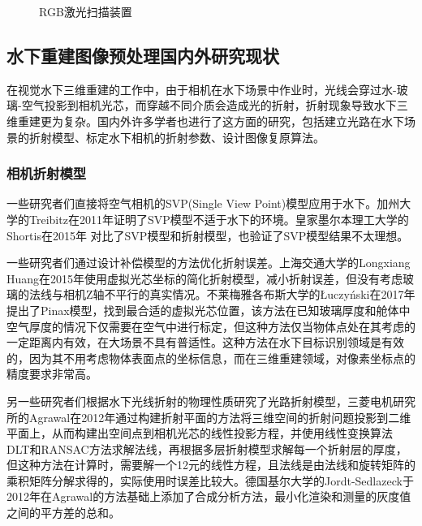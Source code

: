 \begin{figure}[htpb]
	\centering %
	\caption{RGB激光扫描装置}
	\label{fig:1-34}
\end{figure}

\subsection{水下重建图像预处理国内外研究现状}
在视觉水下三维重建的工作中，由于相机在水下场景中作业时，光线会穿过水-玻璃-空气投影到相机光芯，而穿越不同介质会造成光的折射，折射现象导致水下三维重建更为复杂。国内外许多学者也进行了这方面的研究，包括建立光路在水下场景的折射模型、标定水下相机的折射参数、设计图像复原算法。

\subsubsection{相机折射模型}

一些研究者们直接将空气相机的SVP(Single View Point)模型应用于水下。加州大学的Treibitz\cite{Treibitz}在2011年证明了SVP模型不适于水下的环境。皇家墨尔本理工大学的Shortis\cite{Shortis}在2015年 对比了SVP模型和折射模型，也验证了SVP模型结果不太理想。

一些研究者们通过设计补偿模型的方法优化折射误差。上海交通大学的Longxiang Huang\cite{Huang}在2015年使用虚拟光芯坐标的简化折射模型，减小折射误差，但没有考虑玻璃的法线与相机Z轴不平行的真实情况。不莱梅雅各布斯大学的Łuczyński\cite{Łuczyński}在2017年提出了Pinax模型，找到最合适的虚拟光芯位置，该方法在已知玻璃厚度和舱体中空气厚度的情况下仅需要在空气中进行标定，但这种方法仅当物体点处在其考虑的一定距离内有效，在大场景不具有普适性。这种方法在水下目标识别领域是有效的，因为其不用考虑物体表面点的坐标信息，而在三维重建领域，对像素坐标点的精度要求非常高。

另一些研究者们根据水下光线折射的物理性质研究了光路折射模型，三菱电机研究所的Agrawal\cite{Agrawal}在2012年通过构建折射平面的方法将三维空间的折射问题投影到二维平面上，从而构建出空间点到相机光芯的线性投影方程，并使用线性变换算法DLT和RANSAC\cite{RANSAC}方法求解法线，再根据多层折射模型求解每一个折射层的厚度，但这种方法在计算时，需要解一个12元的线性方程，且法线是由法线和旋转矩阵的乘积矩阵分解求得的，实际使用时误差比较大。德国基尔大学的Jordt-Sedlazeck\cite{Jordt}于2012年在Agrawal的方法基础上添加了合成分析方法，最小化渲染和测量的灰度值之间的平方差的总和。

